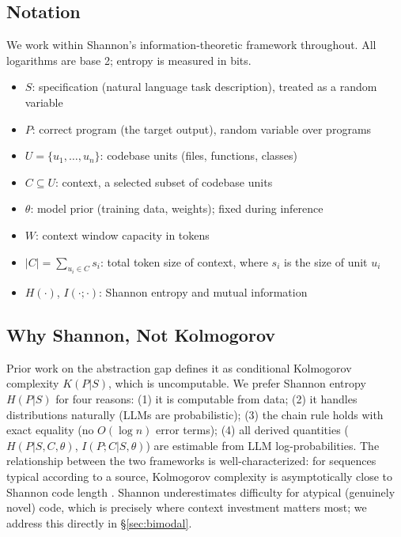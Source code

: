 \documentclass[11pt, a4paper, copyright]{googledeepmind}
\begin{document}
\subsection{Notation}

We work within Shannon's information-theoretic framework throughout. All logarithms are base 2; entropy is measured in bits.

\begin{itemize}[nosep]
    \item $S$: specification (natural language task description), treated as a random variable
    \item $P$: correct program (the target output), random variable over programs
    \item $U = \{u_1, \ldots, u_n\}$: codebase units (files, functions, classes)
    \item $C \subseteq U$: context, a selected subset of codebase units
    \item $\theta$: model prior (training data, weights); fixed during inference
    \item $W$: context window capacity in tokens
    \item $|C| = \sum_{u_i \in C} s_i$: total token size of context, where $s_i$ is the size of unit $u_i$
    \item $H(\cdot)$, $I(\cdot;\cdot)$: Shannon entropy and mutual information
\end{itemize}

\subsection{Why Shannon, Not Kolmogorov}

Prior work on the abstraction gap defines it as conditional Kolmogorov complexity $K(P|S)$, which is uncomputable. We prefer Shannon entropy $H(P|S)$ for four reasons: (1) it is computable from data; (2) it handles distributions naturally (LLMs are probabilistic); (3) the chain rule holds with exact equality (no $O(\log n)$ error terms); (4) all derived quantities ($H(P|S,C,\theta)$, $I(P;C|S,\theta)$) are estimable from LLM log-probabilities. The relationship between the two frameworks is well-characterized: for sequences typical according to a source, Kolmogorov complexity is asymptotically close to Shannon code length \citep{vitanyi2004shannon}. Shannon underestimates difficulty for atypical (genuinely novel) code, which is precisely where context investment matters most; we address this directly in \S\ref{sec:bimodal}.
\end{document}
